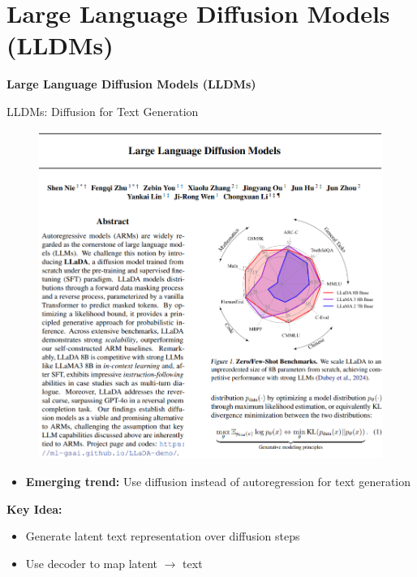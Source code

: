 \section{Large Language Diffusion Models (LLDMs)}
\begin{frame}{}
    \LARGE \textbf{Large Language Diffusion Models (LLDMs)}
\end{frame}

\begin{frame}[allowframebreaks]{LLDMs: Diffusion for Text Generation}
    \begin{figure}
        \centering
        \includegraphics[height=0.9\textheight,width=1.05\textwidth,keepaspectratio]{images/recent-advance/lldm-paper.png}
    \end{figure}
\framebreak
    \begin{itemize}
        \item \textbf{Emerging trend:} Use diffusion instead of autoregression for text generation
    \end{itemize}
    \vspace{0.5em}
    \textbf{Key Idea:}
    \begin{itemize}
        \item Generate latent text representation over diffusion steps
        \item Use decoder to map latent $\rightarrow$ text
    \end{itemize}

\end{frame}
